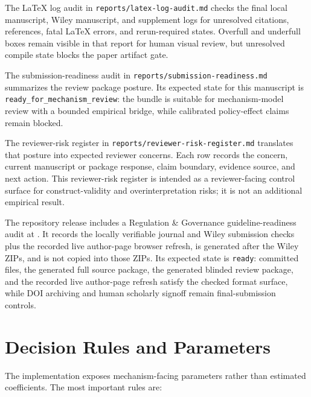 The LaTeX log audit in \texttt{reports/latex-log-audit.md} checks the final local manuscript, Wiley manuscript, and supplement logs for unresolved citations, references, fatal LaTeX errors, and rerun-required states. Overfull and underfull boxes remain visible in that report for human visual review, but unresolved compile state blocks the paper artifact gate.

The submission-readiness audit in \texttt{reports/submission-readiness.md} summarizes the review package posture. Its expected state for this manuscript is \texttt{ready\_for\_mechanism\_review}: the bundle is suitable for mechanism-model review with a bounded empirical bridge, while calibrated policy-effect claims remain blocked.

The reviewer-risk register in \texttt{reports/reviewer-risk-register.md} translates that posture into expected reviewer concerns. Each row records the concern, current manuscript or package response, claim boundary, evidence source, and next action. This reviewer-risk register is intended as a reviewer-facing control surface for construct-validity and overinterpretation risks; it is not an additional empirical result.

The repository release includes a Regulation \& Governance guideline-readiness audit at . It records the locally verifiable journal and Wiley submission checks plus the recorded live author-page browser refresh, is generated after the Wiley ZIPs, and is not copied into those ZIPs. Its expected state is \texttt{ready}: committed files, the generated full source package, the generated blinded review package, and the recorded live author-page refresh satisfy the checked format surface, while DOI archiving and human scholarly signoff remain final-submission controls.

\section{Decision Rules and Parameters}

The implementation exposes mechanism-facing parameters rather than estimated coefficients. The most important rules are:

